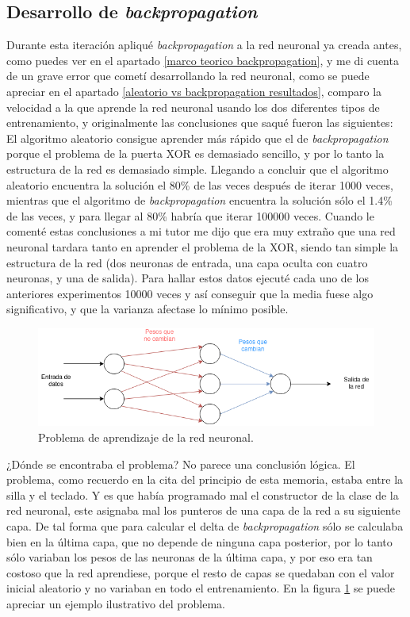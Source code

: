 \subsection{Desarrollo de \textit{backpropagation}}
Durante esta iteración apliqué \textit{backpropagation} a la red neuronal ya creada antes, como puedes ver en el apartado \ref{marco teorico backpropagation}, y me di cuenta de un grave error que cometí desarrollando la red neuronal, como se puede apreciar en el apartado \ref{aleatorio vs backpropagation resultados}, comparo la velocidad a la que aprende la red neuronal usando los dos diferentes tipos de entrenamiento, y originalmente las conclusiones que saqué fueron las siguientes:
\\
El algoritmo aleatorio consigue aprender más rápido que el de \textit{backpropagation} porque el problema de la puerta XOR es demasiado sencillo, y por lo tanto la estructura de la red es demasiado simple. Llegando a concluir que el algoritmo aleatorio encuentra la solución el 80\% de las veces después de iterar 1000 veces, mientras que el algoritmo de \textit{backpropagation} encuentra la solución sólo el 1.4\% de las veces, y para llegar al 80\% habría que iterar 100000 veces. Cuando le comenté estas conclusiones a mi tutor me dijo que era muy extraño que una red neuronal tardara tanto en aprender el problema de la XOR, siendo tan simple la estructura de la red (dos neuronas de entrada, una capa oculta con cuatro neuronas, y una de salida). Para hallar estos datos ejecuté cada uno de los anteriores experimentos 10000 veces y así conseguir que la media fuese algo significativo, y que la varianza afectase lo mínimo posible.

\begin{figure}[H]
	\centering
	\includegraphics[width=15cm]{archivos/imagenes/problema-de-aprendizaje-red.png}
	\caption{Problema de aprendizaje de la red neuronal.}
	\label{problema aprendizaje red neuronal}
\end{figure}

¿Dónde se encontraba el problema? No parece una conclusión lógica. El problema, como recuerdo en la cita del principio de esta memoria, estaba entre la silla y el teclado. Y es que había programado mal el constructor de la clase de la red neuronal, este asignaba mal los punteros de una capa de la red a su siguiente capa. De tal forma que para calcular el delta de \textit{backpropagation} sólo se calculaba bien en la última capa, que no depende de ninguna capa posterior, por lo tanto sólo variaban los pesos de las neuronas de la última capa, y por eso era tan costoso que la red aprendiese, porque el resto de capas se quedaban con el valor inicial aleatorio y no variaban en todo el entrenamiento. En la figura \ref{problema aprendizaje red neuronal} se puede apreciar un ejemplo ilustrativo del problema.


